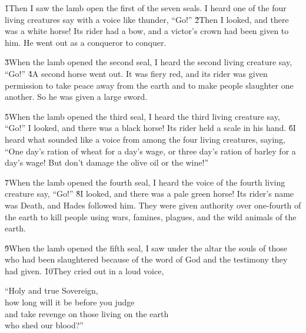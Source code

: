 \v{1}Then I saw the lamb open the first of the seven seals. I heard one of the four living creatures say with a voice like thunder, ``Go!'' \v{2}Then I looked, and there was a white horse! Its rider had a bow, and a victor's crown had been given to him. He went out as a conqueror to conquer.

\v{3}When the lamb opened the second seal, I heard the second living creature say, ``Go!'' \v{4}A second horse went out. It was fiery red, and its rider was given permission to take peace away from the earth and to make people slaughter one another. So he was given a large sword.

\v{5}When the lamb opened the third seal, I heard the third living creature say, ``Go!'' I looked, and there was a black horse! Its rider held a scale in his hand. \v{6}I heard what sounded like a voice from among the four living creatures, saying, ``One day's ration of wheat for a day's wage, or three day's ration of barley for a day's wage! But don't damage the olive oil or the wine!''

\v{7}When the lamb opened the fourth seal, I heard the voice of the fourth living creature say, ``Go!'' \v{8}I looked, and there was a pale green horse! Its rider's name was Death, and Hades followed him. They were given authority over one-fourth of the earth to kill people using wars, famines, plagues, and the wild animals of the earth.

\v{9}When the lamb opened the fifth seal, I saw under the altar the souls of those who had been slaughtered because of the word of God and the testimony they had given. \v{10}They cried out in a loud voice,

\begin{poetry}
\poeml ``Holy and true Sovereign, \\
\poemll    how long will it be before you judge \\
\poeml and take revenge on those living on the earth \\
\poemll    who shed our blood?''
\end{poetry}

